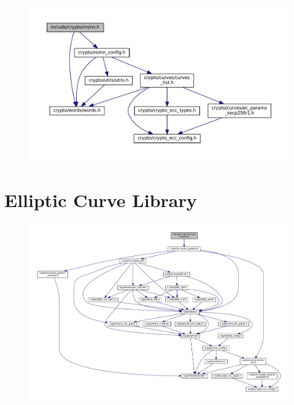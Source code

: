 \begin{figure}[h!]\centering
	\includegraphics[scale=.7]{dep-graph/nn.pdf}
\end{figure}

\newpage
\section{Elliptic Curve Library}
\begin{figure}[h!]\centering
	\includegraphics[scale=.545, angle=-90]{dep-graph/curves.pdf}
\end{figure}
\newpage

